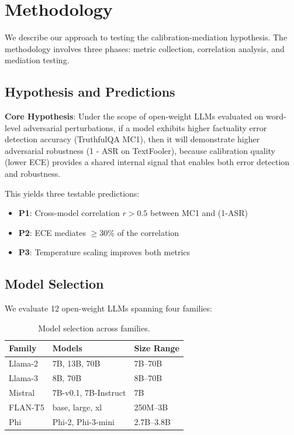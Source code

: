 \section{Methodology}

We describe our approach to testing the calibration-mediation hypothesis. The methodology involves three phases: metric collection, correlation analysis, and mediation testing.

\subsection{Hypothesis and Predictions}

\textbf{Core Hypothesis}: Under the scope of open-weight LLMs evaluated on word-level adversarial perturbations, if a model exhibits higher factuality error detection accuracy (TruthfulQA MC1), then it will demonstrate higher adversarial robustness (1 - ASR on TextFooler), because calibration quality (lower ECE) provides a shared internal signal that enables both error detection and robustness.

This yields three testable predictions:

\begin{itemize}
    \item \textbf{P1}: Cross-model correlation $r > 0.5$ between MC1 and (1-ASR)
    \item \textbf{P2}: ECE mediates $\geq$30\% of the correlation
    \item \textbf{P3}: Temperature scaling improves both metrics
\end{itemize}

\subsection{Model Selection}

We evaluate 12 open-weight LLMs spanning four families:

\begin{table}[h]
\centering
\caption{Model selection across families.}
\label{tab:models}
\begin{tabular}{lll}
\toprule
Family & Models & Size Range \\
\midrule
Llama-2 & 7B, 13B, 70B & 7B--70B \\
Llama-3 & 8B, 70B & 8B--70B \\
Mistral & 7B-v0.1, 7B-Instruct & 7B \\
FLAN-T5 & base, large, xl & 250M--3B \\
Phi & Phi-2, Phi-3-mini & 2.7B--3.8B \\
\bottomrule
\end{tabular}
\end{table}

